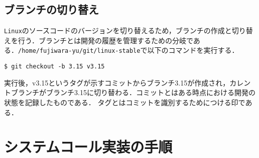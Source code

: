 \documentclass[12pt]{jsarticle}
\begin{document}
\subsection{ブランチの切り替え}
\verb|Linux|のソースコードのバージョンを切り替えるため，ブランチの作成と切り替えを行う．ブランチとは開発の履歴を管理するための分岐である．\verb|/home/fujiwara-yu/git/linux-stable|で以下のコマンドを実行する．
\begin{verbatim}
$ git checkout -b 3.15 v3.15
\end{verbatim}
実行後，v3.15というタグが示すコミットからブランチ3.15が作成され，カレントブランチがブランチ3.15に切り替わる．コミットとはある時点における開発の状態を記録したものである．
タグとはコミットを識別するためにつける印である．

\section{システムコール実装の手順}\label{sec:procedure}
\end{document}
